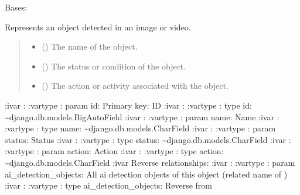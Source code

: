 \documentclass[letterpaper,10pt,english]{sphinxmanual}
\begin{document}
\begin{fulllineitems}
\label{\detokenize{source/meta_models_management:meta_models_management.models.Object}}
\pysigstartsignatures
{}
\pysigstopsignatures
\sphinxAtStartPar
Bases: 

\sphinxAtStartPar
Represents an object detected in an image or video.
\begin{quote}\begin{description}
\begin{itemize}
\item {} 
\sphinxAtStartPar
{} () \textendash{} The name of the object.

\item {} 
\sphinxAtStartPar
{} () \textendash{} The status or condition of the object.

\item {} 
\sphinxAtStartPar
{} () \textendash{} The action or activity associated with the object.

\end{itemize}

\end{description}\end{quote}

\sphinxAtStartPar
:ivar : 
:vartype : param id: Primary key: ID
:ivar : 
:vartype : type id: \textasciitilde{}django.db.models.BigAutoField
:ivar : 
:vartype : param name: Name
:ivar : 
:vartype : type name: \textasciitilde{}django.db.models.CharField
:ivar : 
:vartype : param status: Status
:ivar : 
:vartype : type status: \textasciitilde{}django.db.models.CharField
:ivar : 
:vartype : param action: Action
:ivar :
:vartype : type action: \textasciitilde{}django.db.models.CharField
:ivar Reverse relationships:
:ivar : 
:vartype : param ai\_detection\_objects: All ai detection objects of this object (related name of )
:ivar : 
:vartype : type ai\_detection\_objects: Reverse  from {\hyperref[\detokenize{source/meta_models_management:meta_models_management.models.AIDetection}]{}}


\end{fulllineitems}
\end{document}
